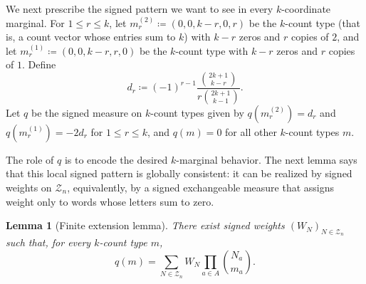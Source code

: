 \documentclass[11pt]{amsart}
\theoremstyle{plain}
\newtheorem{lemma}{Lemma}
\theoremstyle{definition}
\theoremstyle{remark}
\numberwithin{equation}{section}
\newcommand{\1}{\mathbf 1}
\begin{document}
We next prescribe the signed pattern we want to see in every \(k\)-coordinate marginal. For \(1\le r\le k\), let
\(m_r^{\left(2\right)}\coloneqq\left(0,0,k-r,0,r\right)\) be the
\(k\)-count type (that is, a count vector whose entries sum to \(k\)) with \(k-r\) zeros and \(r\) copies of \(2\), and let
\(m_r^{\left(1\right)}\coloneqq\left(0,0,k-r,r,0\right)\) be the
\(k\)-count type with \(k-r\) zeros and \(r\) copies of \(1\). Define
\[
d_r\coloneqq
\left(-1\right)^{r-1}
\frac{\binom{2k+1}{k-r}}{r\binom{2k+1}{k-1}}.
\]
Let \(q\) be the signed measure on \(k\)-count types given by
\(q\left(m_r^{\left(2\right)}\right)=d_r\) and
\(q\left(m_r^{\left(1\right)}\right)=-2d_r\) for \(1\le r\le k\), and
\(q\left(m\right)=0\) for all other \(k\)-count types \(m\).

The role of \(q\) is to encode the desired \(k\)-marginal behavior. The next lemma says that this local signed pattern is globally consistent: it can be realized by signed weights on \(\mathcal Z_n\), equivalently, by a signed exchangeable measure that assigns weight only to words whose letters sum to zero.

\begin{lemma}[Finite extension lemma]\label{lem:finex}
There exist signed weights \(\left(W_N\right)_{N\in\mathcal Z_n}\) such that, for every \(k\)-count type \(m\),
\[
q\left(m\right)=\sum_{N\in\mathcal Z_n}W_N\prod_{a\in A}\binom{N_a}{m_a}.
\]
\end{lemma}
\end{document}
